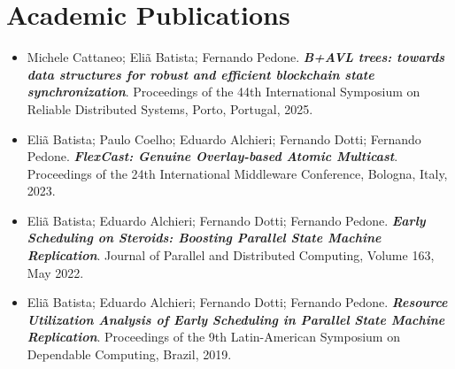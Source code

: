 \documentclass[letterpaper,11pt]{article}
\newcommand{\resumeItem}[1]{
  \item\small{
    {#1 }%
  }
}
\newcommand{\resumeSubItem}[1]{\resumeItem{#1}\vspace{-4pt}}
\newcommand{\resumeSubHeadingListStart}{\begin{itemize}[leftmargin=0.15in, label={}]}
\newcommand{\resumeSubHeadingListEnd}{\end{itemize}}
\begin{document}
\vspace{2pt}

\section{Academic Publications}
\resumeSubHeadingListStart

  \resumeSubItem{Michele Cattaneo; Eliã Batista; Fernando Pedone. \textbf{\textit{B+AVL trees: towards data structures for robust and efficient blockchain state synchronization}}. Proceedings of the 44th International Symposium on Reliable Distributed Systems, Porto, Portugal, 2025.}
  \resumeSubItem{Eliã Batista; Paulo Coelho; Eduardo Alchieri; Fernando Dotti; Fernando Pedone. \textbf{\textit{FlexCast: Genuine Overlay-based Atomic Multicast}}. Proceedings of the 24th International Middleware Conference, Bologna, Italy, 2023.}

  
  \resumeSubItem{Eliã Batista; Eduardo Alchieri; Fernando Dotti; Fernando Pedone. \textbf{\textit{Early Scheduling on Steroids: Boosting Parallel State Machine Replication}}. Journal of Parallel and Distributed Computing, Volume 163, May 2022.}
  
  \resumeSubItem{Eliã Batista; Eduardo Alchieri; Fernando Dotti; Fernando Pedone. \textbf{\textit{Resource Utilization Analysis of Early Scheduling in Parallel State Machine Replication}}. Proceedings of the 9th Latin-American Symposium on Dependable Computing, Brazil, 2019.}
  
\resumeSubHeadingListEnd

\vspace{2pt}
%
\end{document}
